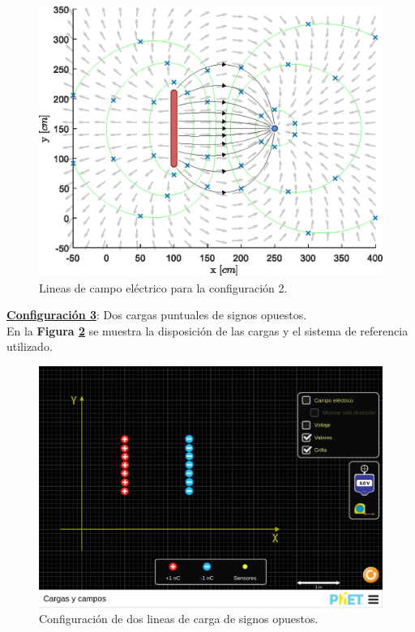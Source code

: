 \documentclass[letter,11pt]{article}
\begin{document}
\begin{figure}[!h]
\centering
\includegraphics[scale=0.91]{resources/p2.eps}
\caption{Lineas de campo eléctrico para la configuración 2.}
\label{figura7}
\end{figure}

\vspace{0.45cm}
\textbf{\underline{Configuración 3}}: Dos cargas puntuales de signos opuestos. \\

En la \textbf{Figura \ref{figura8}} se muestra la disposición de las cargas y el
sistema de referencia utilizado.

\begin{figure}[!h]
\centering
\includegraphics[scale=0.34]{resources/figura08.eps}
\caption{Configuración de dos lineas de carga de signos opuestos.}
\label{figura8}
\end{figure}
\end{document}
